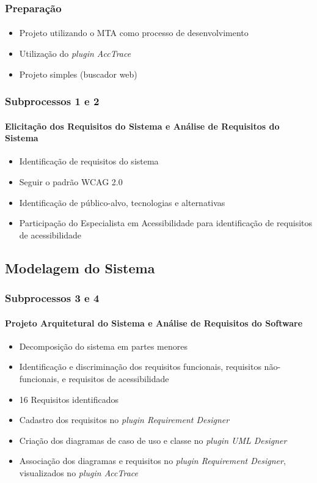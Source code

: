 \documentclass{beamer}
\begin{document}
\begin{frame}
\frametitle{Preparação}
\framesubtitle{}

\begin{itemize}
  \item Projeto utilizando o MTA como processo de desenvolvimento
  \item Utilização do \textit{plugin AccTrace}
  \item Projeto simples (buscador web)
\end{itemize}

\end{frame}

\begin{frame}
\frametitle{Subprocessos 1 e 2}
\framesubtitle{Elicitação dos Requisitos do Sistema e Análise de Requisitos do Sistema}

\begin{itemize}
  \item Identificação de requisitos do sistema
  \item Seguir o padrão WCAG 2.0
  \item Identificação de público-alvo, tecnologias e alternativas
  \item Participação do Especialista em Acessibilidade para identificação de requisitos de acessibilidade
\end{itemize}

\end{frame}

\subsection[Modelagem do Sistema]{Modelagem do Sistema}

\begin{frame}
\frametitle{Subprocessos 3 e 4}
\framesubtitle{Projeto Arquitetural do Sistema e Análise de Requisitos do Software}

\begin{itemize}
  \item Decomposição do sistema em partes menores
  \item Identificação e discriminação dos requisitos funcionais, requisitos não-funcionais, e requisitos de acessibilidade
  \item 16 Requisitos identificados
  \item Cadastro dos requisitos no \textit{plugin Requirement Designer}
  \item Criação dos diagramas de caso de uso e classe no \textit{plugin UML Designer}
  \item Associação dos diagramas e requisitos no \textit{plugin Requirement Designer}, visualizados no \textit{plugin AccTrace}
\end{itemize}

\end{frame}
\end{document}
